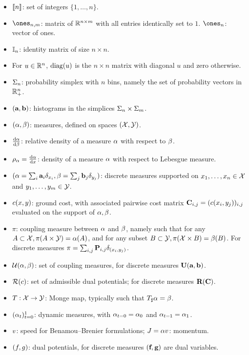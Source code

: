 \begin{itemize}
	\item $\range{n}$: set of integers $\{1,\dots,n\}$.
	\item $\ones_{n,m}$: matrix of $\RR^{n\times m}$ with all entries identically set to $1$. $\ones_{n}$: vector of ones.
	\item $\Identity_n$: identity matrix of size $n\times n$. 
	\item For $u\in\RR^n$, $\diag(u)$ is the $n\times n$ matrix with diagonal $u$ and zero otherwise.
	\item $\simplex_n$: probability simplex with $n$ bins, namely the set of probability vectors in $\RR^n_+$.	
	\item $(\a,\b)$:  histograms in the simplices $\simplex_n \times \simplex_m$. 
	\item $(\al,\be)$:  measures, defined on spaces $(\X,\Y)$.
	\item $\frac{\d\al}{\d\be}$: relative density of a measure $\al$ with respect to $\be$.
	\item $\density{\al} = \frac{\d\al}{\d x}$: density of a measure $\al$ with respect to Lebesgue measure.
	\item $(\al=\sum_i \a_i \delta_{x_i},\be=\sum_j \b_j \delta_{y_j})$: discrete measures supported on $x_1,\dots,x_n\in\X$ and $y_1,\dots,y_m\in\Y$.
	\item $\c(x,y)$: ground cost, with associated pairwise cost matrix $\C_{i,j}=(\c(x_i,y_j))_{i,j}$ evaluated on the support of $\al,\be$.
	\item $\pi$: coupling measure between $\al$ and $\be$, namely such that for any $A\subset\X, \pi(A\times \Y)= \al(A)$, and for any subset $B\subset \Y, \pi(\X\times B)= \be(B)$. For discrete measures $\pi = \sum_{i,j} \P_{i,j}\delta_{(x_i,y_j)}$.
	\item $\Couplings(\al,\be)$: set of coupling measures, for discrete measures $\CouplingsD(\a,\b)$.
	\item $\Potentials(\c)$: set of admissible dual potentials; for discrete measures $\PotentialsD(\C)$.
	\item $\T : \X \rightarrow \Y$: Monge map, typically such that $\T_\sharp \al = \be$.
	\item $(\al_t)_{t=0}^1$: dynamic measures, with $\al_{t=0}=\al_0$ and $\al_{t=1}=\al_1$.
	\item $\speed$: speed for Benamou--Brenier formulations; $\Moment=\al \speed$: momentum.
	\item $(\f,\g)$: dual potentials, for discrete measures $(\fD,\gD)$ are dual variables.

\end{itemize}
